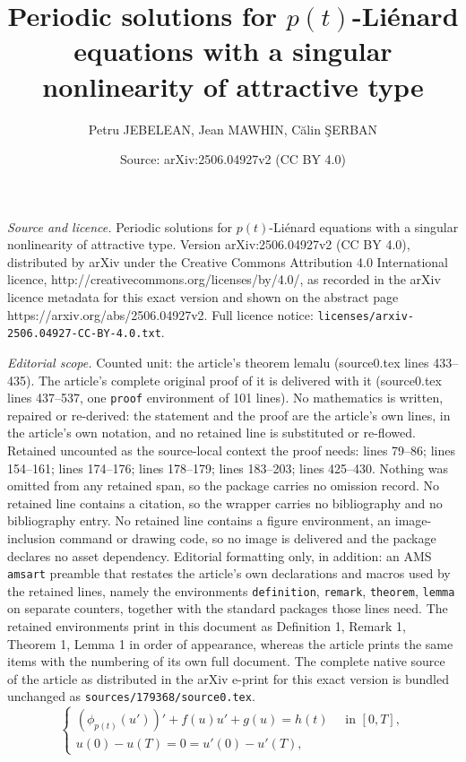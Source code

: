 \documentclass[10pt,a4paper]{amsart}
\title{Periodic solutions for $p(t)$-Li\'{e}nard equations with a singular nonlinearity of attractive type}
\author{Petru JEBELEAN, Jean MAWHIN, C\u{a}lin \c{S}ERBAN}
\date{Source: arXiv:2506.04927v2 (CC BY 4.0)}
\begin{document}
\maketitle

\noindent\emph{Source and licence.} Periodic solutions for $p(t)$-Li\'{e}nard equations with a singular nonlinearity of attractive type. Version arXiv:2506.04927v2 (CC BY 4.0), distributed by arXiv under the Creative Commons Attribution 4.0 International licence, http://creativecommons.org/licenses/by/4.0/, as recorded in the arXiv licence metadata for this exact version and shown on the abstract page https://arxiv.org/abs/2506.04927v2. Full licence notice: \texttt{licenses/arxiv-2506.04927-CC-BY-4.0.txt}.\par\smallskip

\noindent\textit{Editorial scope.} Counted unit: the article's theorem lemalu (source0.tex lines 433--435). The article's complete original proof of it is delivered with it (source0.tex lines 437--537, one \texttt{proof} environment of 101 lines). No mathematics is written, repaired or re-derived: the statement and the proof are the article's own lines, in the article's own notation, and no retained line is substituted or re-flowed.  Retained uncounted as the source-local context the proof needs: lines 79--86; lines 154--161; lines 174--176; lines 178--179; lines 183--203; lines 425--430.  Nothing was omitted from any retained span, so the package carries no omission record.  No retained line contains a citation, so the wrapper carries no bibliography and no bibliography entry.  No retained line contains a figure environment, an image-inclusion command or drawing code, so no image is delivered and the package declares no asset dependency.  Editorial formatting only, in addition: an AMS \texttt{amsart} preamble that restates the article's own declarations and macros used by the retained lines, namely the environments \texttt{definition}, \texttt{remark}, \texttt{theorem}, \texttt{lemma} on separate counters, together with the standard packages those lines need.  The retained environments print in this document as Definition 1, Remark 1, Theorem 1, Lemma 1 in order of appearance, whereas the article prints the same items with the numbering of its own full document.  The complete native source of the article as distributed in the arXiv e-print for this exact version is bundled unchanged as \texttt{sources/179368/source0.tex}.
\begin{equation}\label{pb1}
	\left \{
            \begin{array}{ll}
		      (\phi_{p(t)}(u'))'+f(u)u'+g(u)=h(t)\quad \mbox{ in }[0,T],\\
		      u(0)-u(T)=0=u'(0)-u'(T),
			\end{array}
\right.
\end{equation}
\end{document}
